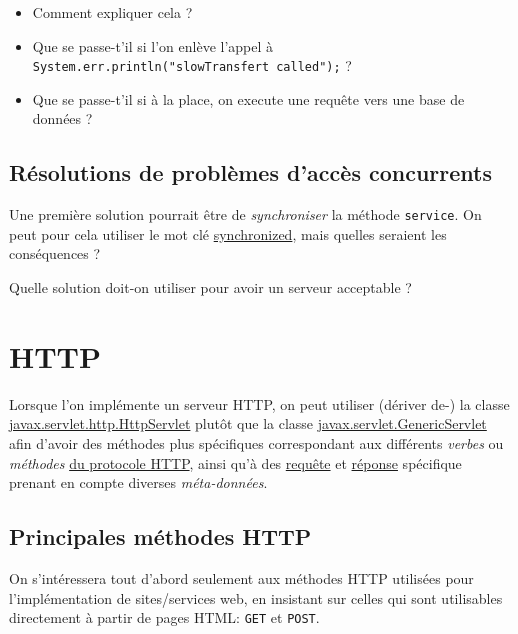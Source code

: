 \documentclass[11pt]{article}
\begin{document}
\begin{itemize}
\item Comment expliquer cela ?
\item Que se passe-t'il si l'on enlève l'appel à \texttt{System.err.println("slowTransfert called");} ?
\item Que se passe-t'il si à la place, on execute une requête vers une base de données ?
\end{itemize}


\subsection{Résolutions de problèmes d'accès concurrents}
\label{sec:org4d57fa8}

Une première solution pourrait être de \emph{synchroniser} la méthode \texttt{service}. On
peut pour cela utiliser le mot clé \href{https://docs.oracle.com/javase/tutorial/essential/concurrency/syncmeth.html}{synchronized}, mais quelles seraient les
conséquences ?

Quelle solution doit-on utiliser pour avoir un serveur acceptable ?

\section{HTTP}
\label{sec:org944cbf0}

Lorsque l'on implémente un serveur HTTP, on peut utiliser (dériver de-) la
classe \href{https://tomcat.apache.org/tomcat-5.5-doc/servletapi/javax/servlet/http/HttpServlet.html}{javax.servlet.http.HttpServlet} plutôt que la classe
\href{https://tomcat.apache.org/tomcat-5.5-doc/servletapi/javax/servlet/GenericServlet.html}{javax.servlet.GenericServlet} afin d'avoir des méthodes plus spécifiques
correspondant aux différents \emph{verbes} ou \emph{méthodes} \href{https://fr.wikipedia.org/wiki/Hypertext_Transfer_Protocol#M.C3.A9thodes}{du protocole HTTP}, ainsi
qu'à des \href{https://tomcat.apache.org/tomcat-5.5-doc/servletapi/javax/servlet/http/HttpServletRequest.html}{requête} et \href{https://tomcat.apache.org/tomcat-5.5-doc/servletapi/javax/servlet/http/HttpServletResponse.html}{réponse} spécifique prenant en compte diverses \emph{méta-données}.


\subsection{Principales méthodes HTTP}
\label{sec:org40b1268}
On s'intéressera tout d'abord seulement aux méthodes HTTP utilisées pour
l'implémentation de sites/services web, en insistant sur celles qui sont
utilisables directement à partir de pages HTML: \texttt{GET} et \texttt{POST}.
\end{document}
